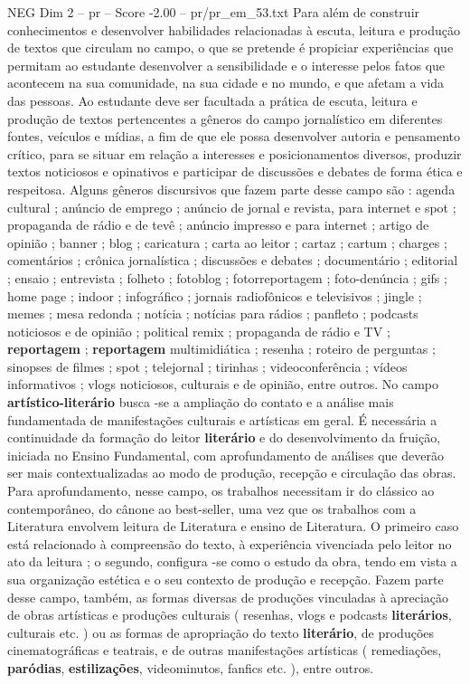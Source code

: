 \begin{textsample}{NEG Dim 2 – pr – Score -2.00 – pr/pr\_em\_53.txt}
Para além de construir conhecimentos e desenvolver habilidades relacionadas à escuta, leitura e produção de textos que circulam no campo, o que se pretende é propiciar experiências que permitam ao estudante desenvolver a sensibilidade e o interesse pelos fatos que acontecem na sua comunidade, na sua cidade e no mundo, e que afetam a vida das pessoas.
Ao estudante deve ser facultada a prática de escuta, leitura e produção de textos pertencentes a gêneros do campo jornalístico em diferentes fontes, veículos e mídias, a fim de que ele possa desenvolver autoria e pensamento crítico, para se situar em relação a interesses e posicionamentos diversos, produzir textos noticiosos e opinativos e participar de discussões e debates de forma ética e respeitosa.
Alguns gêneros discursivos que fazem parte desse campo são : agenda cultural ; anúncio de emprego ; anúncio de jornal e revista, para internet e spot ; propaganda de rádio e de tevê ; anúncio impresso e para internet ; artigo de opinião ; banner ; blog ; caricatura ; carta ao leitor ; cartaz ; cartum ; charges ; comentários ; crônica jornalística ; discussões e debates ; documentário ; editorial ; ensaio ; entrevista ; folheto ; fotoblog ; fotorreportagem ; foto-denúncia ; gifs ; home page ; indoor ; infográfico ; jornais radiofônicos e televisivos ; jingle ; memes ; mesa redonda ; notícia ; notícias para rádios ; panfleto ; podcasts noticiosos e de opinião ; political remix ; propaganda de rádio e TV ; \textbf{reportagem} ; \textbf{reportagem} multimidiática ; resenha ; roteiro de perguntas ; sinopses de filmes ; spot ; telejornal ; tirinhas ; videoconferência ; vídeos informativos ; vlogs noticiosos, culturais e de opinião, entre outros.
No campo \textbf{artístico-literário} busca -se a ampliação do contato e a análise mais fundamentada de manifestações culturais e artísticas em geral.
É necessária a continuidade da formação do leitor \textbf{literário} e do desenvolvimento da fruição, iniciada no Ensino Fundamental, com aprofundamento de análises que deverão ser mais contextualizadas ao modo de produção, recepção e circulação das obras.
Para aprofundamento, nesse campo, os trabalhos necessitam ir do clássico ao contemporâneo, do cânone ao best-seller, uma vez que os trabalhos com a Literatura envolvem leitura de Literatura e ensino de Literatura.
O primeiro caso está relacionado à compreensão do texto, à experiência vivenciada pelo leitor no ato da leitura ; o segundo, configura -se como o estudo da obra, tendo em vista a sua organização estética e o seu contexto de produção e recepção.
Fazem parte desse campo, também, as formas diversas de produções vinculadas à apreciação de obras artísticas e produções culturais ( resenhas, vlogs e podcasts \textbf{literários}, culturais etc. ) ou as formas de apropriação do texto \textbf{literário}, de produções cinematográficas e teatrais, e de outras manifestações artísticas ( remediações, \textbf{paródias}, \textbf{estilizações}, videominutos, fanfics etc. ), entre outros.

\end{textsample}
